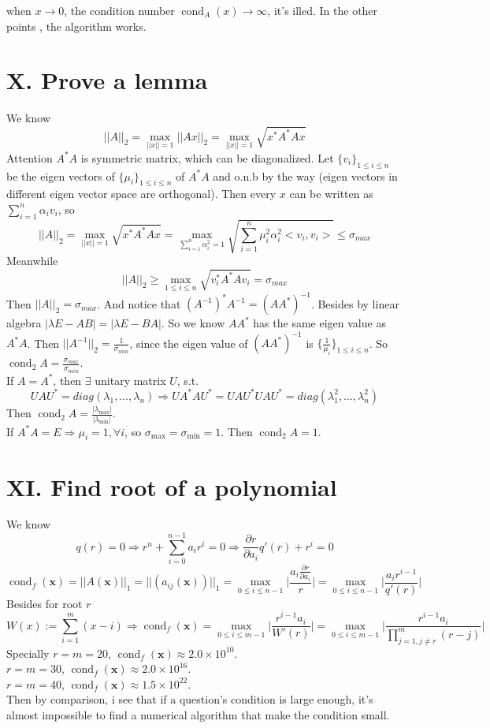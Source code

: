 \documentclass[a4paper]{article}
\begin{document}
when $x \to 0$, the condition number $\operatorname{cond}_A(x)\to \infty$, it's illed. In the other points
, the algorithm works.

\section*{X. Prove a lemma}
We know
\[
||A||_2 = \max_{||x||=1}||Ax||_2 = \max_{||x||=1}\sqrt{x^{*}A^{*}Ax}
\]
Attention $A^* A$ is symmetric matrix, which can be diagonalized.
Let $\{v_i\}_{1\leqslant i \leqslant n}$ be the eigen vectors of $\{\mu_i\}_{1\leqslant i \leqslant n}$ of $A^* A$ and o.n.b by the way
(eigen vectors in different eigen vector space are orthogonal).
Then every $x$ can be written as $\sum\limits_{i=1}^{n}\alpha_i v_i$, so 
\[
||A||_2 = \max_{||x||=1}\sqrt{x^{*}A^{*}Ax} = 
\max_{\sum\limits_{i=1}^{n}\alpha_i^2 = 1}\sqrt{\sum\limits_{i=1}^{n}\mu_i^2 \alpha_i^2<v_i,v_i>}
\leqslant \sigma_{max}
\]
Meanwhile 
\[
||A||_2 \geqslant \max_{1\leqslant i \leqslant n} \sqrt{v_i^*A^*Av_i} = \sigma_{max}
\]
Then $||A||_2 = \sigma_{max}$. And notice that $(A^{-1})^*A^{-1} = (AA^*)^{-1}$. Besides by linear algebra
$|\lambda E - AB| = |\lambda E - BA|$. So we know $AA^*$ has the same eigen value as $A^*A$.
Then $||A^{-1}||_2 = \frac{1}{\sigma_{min}}$, since the eigen value of $(AA^*)^{-1}$ is $\{\frac{1}{\mu_i}\}_{1\leqslant i \leqslant n}$.
So $\operatorname{cond}_2 A = \frac{\sigma_{max}}{\sigma_{min}}$. \\
If $A = A^*$, then $\exists $ unitary matrix $U$, s.t.
\[
UAU^* = diag(\lambda_1,\ldots,\lambda_n) \Rightarrow UA^*AU^* = UAU^*UAU^* = diag(\lambda_1^2,\ldots,\lambda_n^2)
\]
Then $\operatorname{cond}_2 A = \frac{|\lambda_{\max}|}{|\lambda_{\min}|}$.
\\
If $A^*A = E \Rightarrow \mu_i = 1, \forall i$, so $\sigma_{\max} = \sigma_{\min} = 1$. Then $\operatorname{cond}_2 A = 1$.
\section*{XI. Find root of a polynomial}
We know
\[
q(r) = 0 \Rightarrow r^n + \sum\limits_{i = 0}^{n-1}a_i r^i = 0
\Rightarrow \frac{\partial r}{\partial a_i}q'(r) + r^i = 0
\]
\[
\operatorname{cond}_{f}(\mathbf{x})  = ||A(\mathbf{x})||_1
= ||(a_{ij}(\mathbf{x}))||_1
= \max_{0\leqslant i \leqslant n-1}\bigg|\frac{a_i\frac{\partial r}{\partial a_i}}{r}\bigg|
= \max_{0\leqslant i \leqslant n-1}\bigg|\frac{a_ir^{i-1}}{q'(r)}\bigg|
\]
Besides for root $r$
\[
W(x) := \sum_{i=1}^{m}(x-i)
\Rightarrow 
\operatorname{cond}_{f}(\mathbf{x}) = \max_{0\leqslant i \leqslant m-1} \bigg|\frac{r^{i-1}a_i}{W'(r)}\bigg|
= \max_{0\leqslant i \leqslant m-1} \bigg|\frac{r^{i-1}a_i}{\prod\limits_{j = 1,j\neq r}^{m}(r-j)}\bigg|
\]
Specially $r = m = 20$, $\operatorname{cond}_{f}(\mathbf{x}) \approx 2.0 \times 10^{10}$. \\
$r = m = 30$, $\operatorname{cond}_{f}(\mathbf{x}) \approx 2.0 \times 10^{16}$. \\
$r = m = 40$, $\operatorname{cond}_{f}(\mathbf{x}) \approx 1.5 \times 10^{22}$. \\
Then by comparison, i see that if a question's condition is large enough,
 it's almost impossible to find a numerical algorithm that make the condition small.
\end{document}
